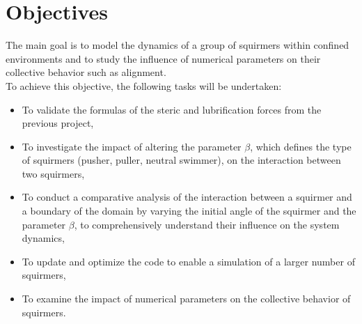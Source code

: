 \documentclass{article}
\begin{document}
\section{Objectives}
The main goal is to model the dynamics of a group of squirmers within confined environments and to
 study the influence of numerical parameters on their collective behavior such as alignment.\\
 To achieve this objective, the following tasks will be undertaken:
 \begin{itemize}
     \item To validate the formulas of the steric and lubrification forces from the previous project,
     \item To investigate the impact of altering the parameter $\beta$, which defines the
    type of squirmers (pusher, puller, neutral swimmer), on the interaction between two squirmers,
     \item To conduct a comparative analysis of the interaction between a squirmer and a 
    boundary of the domain by varying the initial angle of the squirmer and the parameter $\beta$, 
    to comprehensively understand their influence on the system dynamics,
     \item To update and optimize the code to enable a simulation of a larger number of squirmers,
     \item To examine the impact of numerical parameters on the collective behavior of squirmers.
\end{itemize}

 
\end{document}
